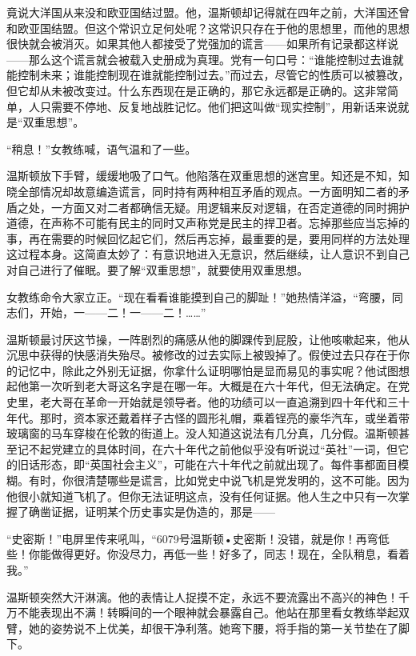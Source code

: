 竟说大洋国从来没和欧亚国结过盟。他，温斯顿却记得就在四年之前，大洋国还曾和欧亚国结盟。但这个常识立足何处呢？这常识只存在于他的思想里，而他的思想很快就会被消灭。如果其他人都接受了党强加的谎言------如果所有记录都这样说------那么这个谎言就会被载入史册成为真理。党有一句口号：``谁能控制过去谁就能控制未来；谁能控制现在谁就能控制过去。''而过去，尽管它的性质可以被篡改，但它却从未被改变过。什么东西现在是正确的，那它永远都是正确的。这非常简单，人只需要不停地、反复地战胜记忆。他们把这叫做``现实控制''，用新话来说就是``双重思想''。

``稍息！''女教练喊，语气温和了一些。

温斯顿放下手臂，缓缓地吸了口气。他陷落在双重思想的迷宫里。知还是不知，知晓全部情况却故意编造谎言，同时持有两种相互矛盾的观点。一方面明知二者的矛盾之处，一方面又对二者都确信无疑。用逻辑来反对逻辑，在否定道德的同时拥护道德，在声称不可能有民主的同时又声称党是民主的捍卫者。忘掉那些应当忘掉的事，再在需要的时候回忆起它们，然后再忘掉，最重要的是，要用同样的方法处理这过程本身。这简直太妙了：有意识地进入无意识，然后继续，让人意识不到自己对自己进行了催眠。要了解``双重思想''，就要使用双重思想。

女教练命令大家立正。``现在看看谁能摸到自己的脚趾！''她热情洋溢，``弯腰，同志们，开始，一------二！一------二！\ldots\ldots''

温斯顿最讨厌这节操，一阵剧烈的痛感从他的脚踝传到屁股，让他咳嗽起来，他从沉思中获得的快感消失殆尽。被修改的过去实际上被毁掉了。假使过去只存在于你的记忆中，除此之外别无证据，你拿什么证明哪怕是显而易见的事实呢？他试图想起他第一次听到老大哥这名字是在哪一年。大概是在六十年代，但无法确定。在党史里，老大哥在革命一开始就是领导者。他的功绩可以一直追溯到四十年代和三十年代。那时，资本家还戴着样子古怪的圆形礼帽，乘着锃亮的豪华汽车，或坐着带玻璃窗的马车穿梭在伦敦的街道上。没人知道这说法有几分真，几分假。温斯顿甚至记不起党建立的具体时间，在六十年代之前他似乎没有听说过``英社''一词，但它的旧话形态，即``英国社会主义''，可能在六十年代之前就出现了。每件事都面目模糊。有时，你很清楚哪些是谎言，比如党史中说飞机是党发明的，这不可能。因为他很小就知道飞机了。但你无法证明这点，没有任何证据。他人生之中只有一次掌握了确凿证据，证明某个历史事实是伪造的，那是------

``史密斯！''电屏里传来吼叫，``6079号温斯顿•史密斯！没错，就是你！再弯低些！你能做得更好。你没尽力，再低一些！好多了，同志！现在，全队稍息，看着我。''

温斯顿突然大汗淋漓。他的表情让人捉摸不定，永远不要流露出不高兴的神色！千万不能表现出不满！转瞬间的一个眼神就会暴露自己。他站在那里看女教练举起双臂，她的姿势说不上优美，却很干净利落。她弯下腰，将手指的第一关节垫在了脚下。

